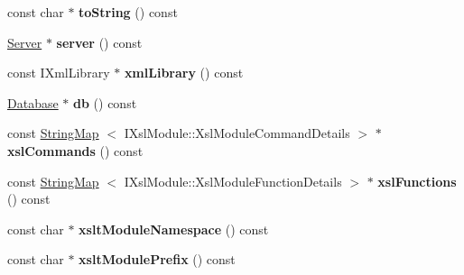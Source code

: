 \begin{DoxyCompactItemize}
\item 
\hypertarget{classgeneral__server_1_1Conversation_a198c575ead3392e9ccece7d492c1d55c}{const char $\ast$ {\bfseries to\-String} () const }\label{classgeneral__server_1_1Conversation_a198c575ead3392e9ccece7d492c1d55c}

\item 
\hypertarget{classgeneral__server_1_1Conversation_a762e385cba013efa59e3650665a1cd89}{\hyperlink{classgeneral__server_1_1Server}{\-Server} $\ast$ {\bfseries server} () const }\label{classgeneral__server_1_1Conversation_a762e385cba013efa59e3650665a1cd89}

\item 
\hypertarget{classgeneral__server_1_1Conversation_a1fc8000bf08d235e0a18d53c1163d265}{const \-I\-Xml\-Library $\ast$ {\bfseries xml\-Library} () const }\label{classgeneral__server_1_1Conversation_a1fc8000bf08d235e0a18d53c1163d265}

\item 
\hypertarget{classgeneral__server_1_1Conversation_a9f5307c54c9d2916ae16b10494a5dbc0}{\hyperlink{classgeneral__server_1_1Database}{\-Database} $\ast$ {\bfseries db} () const }\label{classgeneral__server_1_1Conversation_a9f5307c54c9d2916ae16b10494a5dbc0}

\item 
\hypertarget{classgeneral__server_1_1Conversation_a05a43abdebe4818132caa3b44f9c942b}{const \hyperlink{classgeneral__server_1_1StringMap}{\-String\-Map}\*
$<$ \-I\-Xsl\-Module\-::\-Xsl\-Module\-Command\-Details $>$ $\ast$ {\bfseries xsl\-Commands} () const }\label{classgeneral__server_1_1Conversation_a05a43abdebe4818132caa3b44f9c942b}

\item 
\hypertarget{classgeneral__server_1_1Conversation_a177bd6b45896512a2552c19f1af675a0}{const \hyperlink{classgeneral__server_1_1StringMap}{\-String\-Map}\*
$<$ \-I\-Xsl\-Module\-::\-Xsl\-Module\-Function\-Details $>$ $\ast$ {\bfseries xsl\-Functions} () const }\label{classgeneral__server_1_1Conversation_a177bd6b45896512a2552c19f1af675a0}

\item 
\hypertarget{classgeneral__server_1_1Conversation_a1f9f03ef7e1abf10dba67f160898304a}{const char $\ast$ {\bfseries xslt\-Module\-Namespace} () const }\label{classgeneral__server_1_1Conversation_a1f9f03ef7e1abf10dba67f160898304a}

\item 
\hypertarget{classgeneral__server_1_1Conversation_ae4f75b82d0807e8a85cee8db94a81aa9}{const char $\ast$ {\bfseries xslt\-Module\-Prefix} () const }\label{classgeneral__server_1_1Conversation_ae4f75b82d0807e8a85cee8db94a81aa9}


\end{DoxyCompactItemize}
